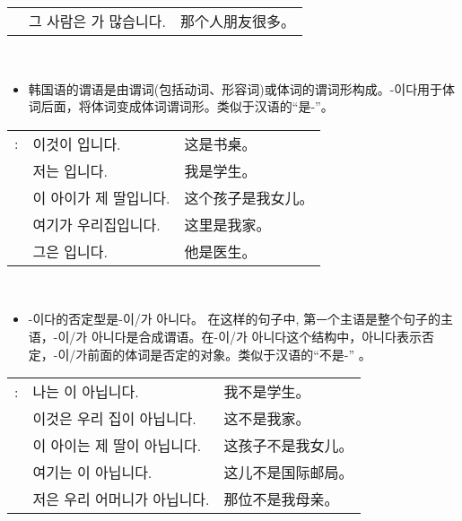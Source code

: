 \begin{grammar}
\begin{grammarsect}[-이/-가]
\begin{tabular}{lll}
            &그 사람은 \ruby{親舊}{친구}가 많습니다.&那个人朋友很多。
        \end{tabular}\\
    \end{grammarsect}
    \begin{grammarsect}[-이다]
        \begin{itemize}
            \item 韩国语的谓语是由谓词(包括动词、形容词)或体词的谓词形构成。-이다用于体词后面，将体词变成体词谓词形。类似于汉语的“是-”。
        \end{itemize}
        \begin{tabular}{lll}
            \ruby{例}{예}: &이것이 \ruby{冊床}{책상}입니다.&这是书桌。\\
            &저는 \ruby{學生}{학생}입니다.&我是学生。\\
            &이 아이가 제 딸입니다.&这个孩子是我女儿。\\
            &여기가 우리집입니다.&这里是我家。\\
            &그\ruby{分}{분}은 \ruby{醫師}{의사}입니다.&他是医生。
        \end{tabular}\\
    \end{grammarsect}
    \begin{grammarsect}
        \begin{itemize}
            \item -이다的否定型是-이/가 아니다。 在这样的句子中, 第ᅳ个主语是整个句子的主语，-이/가 아니다是合成谓语。在-이/가 아니다这个结构中，아니다表示否定，-이/가前面的体词是否定的对象。类似于汉语的“不是-” 。
        \end{itemize}
        \begin{tabular}{lll}
            \ruby{例}{예}:&나는 \ruby{學生}{학생}이 아닙니다.&我不是学生。\\
            &이것은 우리 집이 아닙니다.&这不是我家。\\
            &이 아이는 제 딸이 아닙니다.&这孩子不是我女儿。\\
            &여기는 \ruby{國際郵遞局}{국제우체국}이 아닙니다.&这儿不是国际邮局。\\
            &저\ruby{分}{분}은 우리 어머니가 아닙니다.&那位不是我母亲。
        \end{tabular}\\
    \end{grammarsect}
\end{grammar}
